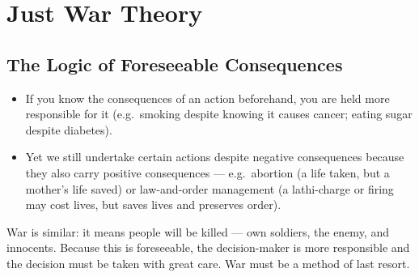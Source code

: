 \section{Just War Theory}

\subsection{The Logic of Foreseeable Consequences}
\begin{KeyConcept}
\begin{itemize}
\item If you know the consequences of an action beforehand, you are held more responsible for it (e.g.\ smoking despite knowing it causes cancer; eating sugar despite diabetes).
\item Yet we still undertake certain actions despite negative consequences because they also carry positive consequences --- e.g.\ abortion (a life taken, but a mother's life saved) or law-and-order management (a lathi-charge or firing may cost lives, but saves lives and preserves order).
\end{itemize}
\end{KeyConcept}

\begin{CriticalPoint}
War is similar: it means people will be killed --- own soldiers, the enemy, and innocents. Because this is foreseeable, the decision-maker is more responsible and the decision must be taken with great care. War must be a method of last resort.
\end{CriticalPoint}

